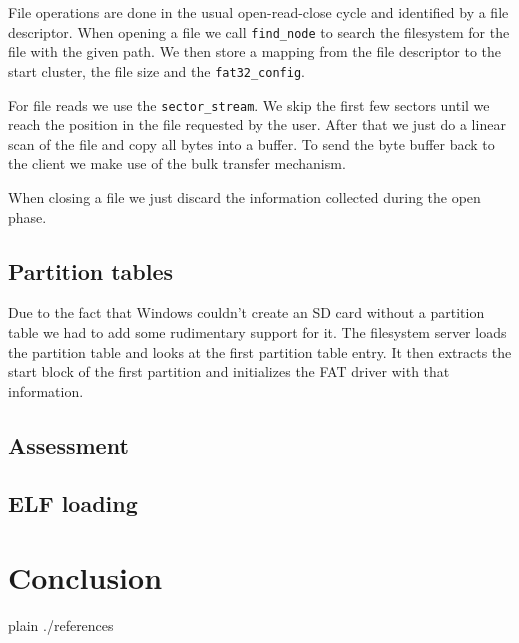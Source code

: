 \documentclass[a4paper,10pt]{article}
\begin{document}
File operations are done in the usual open-read-close cycle and identified by a file descriptor.
When opening a file we call \lstinline!find_node! to search the filesystem for the file with the given path.
We then store a mapping from the file descriptor to the start cluster, the file size and the \lstinline!fat32_config!.

For file reads we use the \lstinline!sector_stream!.
We skip the first few sectors until we reach the position in the file requested by the user.
After that we just do a linear scan of the file and copy all bytes into a buffer.
To send the byte buffer back to the client we make use of the bulk transfer mechanism.

When closing a file we just discard the information collected during the open phase.

\subsection{Partition tables}

Due to the fact that Windows couldn't create an SD card without a partition table we had to add some rudimentary support for it.
The filesystem server loads the partition table and looks at the first partition table entry.
It then extracts the start block of the first partition and initializes the FAT driver with that information.

\subsection{Assessment}


\subsection{ ELF loading}


\section{Conclusion}

\begin{flushleft}
{{{
 {plain}
 {./references}
}}}
\end{flushleft}


\todos
\end{document}

